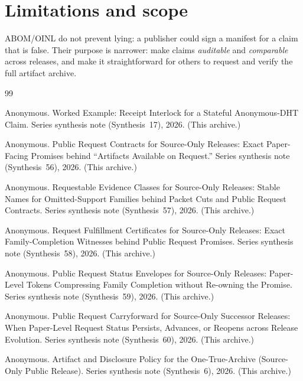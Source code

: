 \documentclass[11pt]{article}
\begin{document}
\section{Limitations and scope}
ABOM/OINL do not prevent lying: a publisher could sign a manifest for a claim that is false.
Their purpose is narrower: make claims \emph{auditable} and \emph{comparable} across releases, and make it straightforward for others to request and verify the full artifact archive.

\begin{thebibliography}{99}\small

Anonymous.
\newblock Worked Example: Receipt Interlock for a Stateful Anonymous-DHT Claim.
\newblock Series synthesis note (Synthesis~17), 2026. (This archive.)

Anonymous.
\newblock Public Request Contracts for Source-Only Releases: Exact Paper-Facing Promises behind ``Artifacts Available on Request.''
\newblock Series synthesis note (Synthesis~56), 2026. (This archive.)

Anonymous.
\newblock Requestable Evidence Classes for Source-Only Releases: Stable Names for Omitted-Support Families behind Packet Cuts and Public Request Contracts.
\newblock Series synthesis note (Synthesis~57), 2026. (This archive.)

Anonymous.
\newblock Request Fulfillment Certificates for Source-Only Releases: Exact Family-Completion Witnesses behind Public Request Promises.
\newblock Series synthesis note (Synthesis~58), 2026. (This archive.)

Anonymous.
\newblock Public Request Status Envelopes for Source-Only Releases: Paper-Level Tokens Compressing Family Completion without Re-owning the Promise.
\newblock Series synthesis note (Synthesis~59), 2026. (This archive.)

Anonymous.
\newblock Public Request Carryforward for Source-Only Successor Releases: When Paper-Level Request Status Persists, Advances, or Reopens across Release Evolution.
\newblock Series synthesis note (Synthesis~60), 2026. (This archive.)

Anonymous.
\newblock Artifact and Disclosure Policy for the One-True-Archive (Source-Only Public Release).
\newblock Series synthesis note (Synthesis~6), 2026. (This archive.)


\end{thebibliography}
\end{document}
